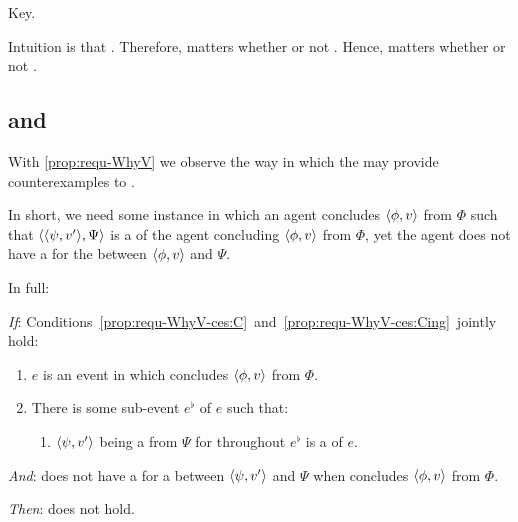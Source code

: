 \begin{note}
  Key.

  Intuition is that \tC{}.
  Therefore, matters whether or not \fc{}.
  Hence, matters whether or not \ros{}.
\end{note}

\subsection{ and \issueConstraint{}}
\label{cha:binding:sec:requ-iC}

\begin{note}
  With \autoref{prop:requ-WhyV} we observe the way in which the  may provide counterexamples to \issueConstraint{}.

  In short, we need some instance in which an agent concludes \(\langle \phi, v \rangle\) from \(\Phi\) such that \(\langle \langle \psi, v' \rangle, \Psi \rangle\) is a \requ{} of the agent concluding \(\langle \phi, v \rangle\) from \(\Phi\), yet the agent does not have a \wit{} for the \ros{} between \(\langle \phi, v \rangle\) and \(\Psi\).

  In full:

  \begin{proposition}
    \label{prop:requ-WhyV-ces}
    \vspace{-\baselineskip}
    \begin{itenum}
    \item[\emph{If}:]
      Conditions~\ref{prop:requ-WhyV-ces:C}~and~\ref{prop:requ-WhyV-ces:Cing}~jointly hold:
      \begin{enumerate}[label=\arabic*., ref=(\arabic*)]
      \item
        \label{prop:requ-WhyV-ces:C}
        \(e\) is an event in which \vAgent{} concludes \(\langle \phi, v \rangle\) from \(\Phi\).
      \item
        \label{prop:requ-WhyV-ces:Cing}
        There is some sub-event \(e^{\flat}\) of \(e\) such that:
        \begin{enumerate}[label=\alph*., ref=(\arabic{enumi}\alph*)]
        \item
          \label{prop:requ-WhyV-ces:Cing:requ}
          \(\langle \psi, v' \rangle\) being a \fc{} from \(\Psi\) for \vAgent{} throughout \(e^{\flat}\) is a \requ{} of \(e\).
        \end{enumerate}
      \end{enumerate}
    \item[\emph{And}:]
      \label{prop:requ-WhyVCes:noW}
      \vAgent{} does not have a \wit{} for a \ros{} between \(\langle \psi, v' \rangle\) and \(\Psi\) when \vAgent{} concludes \(\langle \phi, v \rangle\) from \(\Phi\).
    \item[\emph{Then}:]
      \issueConstraint{} does not hold.
    \end{itenum}
    \vspace{-\baselineskip}
  \end{proposition}


\end{note}
